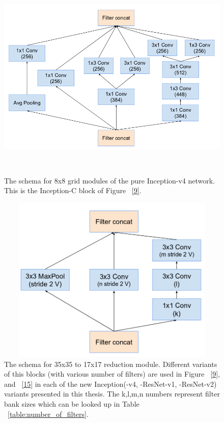 \documentclass[a4paper,12pt, twoside]{NITKReport}
\begin{document}
 \begin{figure}
 \centering
 
    \includegraphics[height=10cm,width=16cm]{figure6.png}
    \caption{The schema for 8x8 grid modules of the pure Inception-v4 network. This is the Inception-C block of Figure ~\ref{9}.}
    \label{6}
  
\end{figure}

\begin{figure}[h]
  \centering
  
    \includegraphics[height=8cm,width=15cm]{figure7.png}
    \caption{The schema for 35x35 to 17x17 reduction module. Different variants of this blocks (with various number of filters) are used in Figure ~\ref{9}, and ~\ref{15} in each of the new Inception(-v4, -ResNet-v1, -ResNet-v2) variants presented in this thesis. The k,l,m,n numbers represent filter bank sizes which can be looked up in Table ~\ref{table:number_of_filters}.}
    \label{7}
  
 \end{figure}
 
\end{document}
